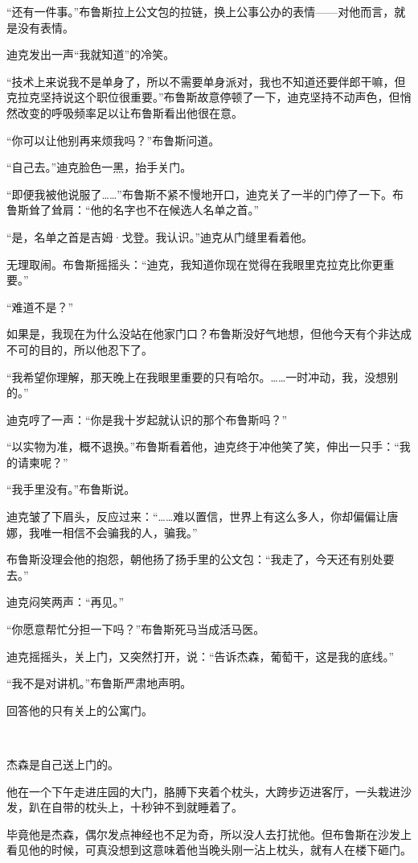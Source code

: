 \documentclass[../main]{subfiles}
\begin{document}
“还有一件事。”布鲁斯拉上公文包的拉链，换上公事公办的表情——对他而言，就是没有表情。

迪克发出一声“我就知道”的冷笑。

“技术上来说我不是单身了，所以不需要单身派对，我也不知道还要伴郎干嘛，但克拉克坚持说这个职位很重要。”布鲁斯故意停顿了一下，迪克坚持不动声色，但悄然改变的呼吸频率足以让布鲁斯看出他很在意。

“你可以让他别再来烦我吗？”布鲁斯问道。

“自己去。”迪克脸色一黑，抬手关门。

“即便我被他说服了……”布鲁斯不紧不慢地开口，迪克关了一半的门停了一下。布鲁斯耸了耸肩：“他的名字也不在候选人名单之首。”

“是，名单之首是吉姆·戈登。我认识。”迪克从门缝里看着他。

无理取闹。布鲁斯摇摇头：“迪克，我知道你现在觉得在我眼里克拉克比你更重要。”

“难道不是？”

如果是，我现在为什么没站在他家门口？布鲁斯没好气地想，但他今天有个非达成不可的目的，所以他忍下了。

“我希望你理解，那天晚上在我眼里重要的只有哈尔。……一时冲动，我，没想别的。”

迪克哼了一声：“你是我十岁起就认识的那个布鲁斯吗？”

“以实物为准，概不退换。”布鲁斯看着他，迪克终于冲他笑了笑，伸出一只手：“我的请柬呢？”

“我手里没有。”布鲁斯说。

迪克皱了下眉头，反应过来：“……难以置信，世界上有这么多人，你却偏偏让唐娜，我唯一相信不会骗我的人，骗我。”

布鲁斯没理会他的抱怨，朝他扬了扬手里的公文包：“我走了，今天还有别处要去。”

迪克闷笑两声：“再见。”

“你愿意帮忙分担一下吗？”布鲁斯死马当成活马医。

迪克摇摇头，关上门，又突然打开，说：“告诉杰森，葡萄干，这是我的底线。”

“我不是对讲机。”布鲁斯严肃地声明。

回答他的只有关上的公寓门。

~\

杰森是自己送上门的。

他在一个下午走进庄园的大门，胳膊下夹着个枕头，大跨步迈进客厅，一头栽进沙发，趴在自带的枕头上，十秒钟不到就睡着了。

毕竟他是杰森，偶尔发点神经也不足为奇，所以没人去打扰他。但布鲁斯在沙发上看见他的时候，可真没想到这意味着他当晚头刚一沾上枕头，就有人在楼下砸门。
\end{document}

